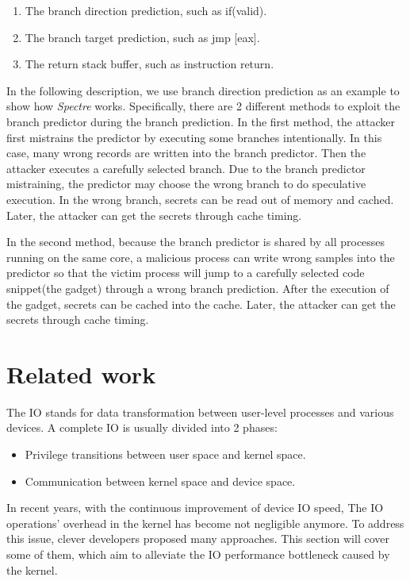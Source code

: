 \begin{enumerate}
  \item The branch direction prediction,  such as if(valid).
  \item The branch target prediction, such as jmp [eax].
  \item The return stack buffer, such as instruction return.
\end{enumerate}
In the following description, we use branch direction prediction as an example to show 
how \emph{Spectre} works.  Specifically, there are 2 different methods to exploit the branch 
predictor during the branch prediction.  In the first method, the attacker first mistrains 
the predictor by executing some branches intentionally.  In this case, many wrong records 
are written into the branch predictor. Then the attacker executes a carefully selected branch. 
Due to the branch predictor mistraining, the predictor may choose the wrong branch to do 
speculative execution.  In the wrong branch, secrets can be read out of memory and cached. 
Later, the attacker can get the secrets through cache timing\cite{11}.

In the second method, 
because the branch predictor is shared by all processes running on the same core, 
a malicious process can write wrong samples into the predictor so that the victim process will 
jump to a carefully selected code snippet(the gadget) through a wrong branch prediction. 
After the execution of the gadget, secrets can be cached into the cache. Later, the attacker 
can get the secrets through cache timing.

\section{Related work}
The IO stands for data transformation between user-level processes 
and various devices. A complete IO is usually divided into 2 phases:
\begin{itemize}
  \item Privilege transitions between user space and kernel space.
  \item Communication between kernel space and device space.
\end{itemize}  
In recent years, with the continuous improvement of device IO speed, 
The IO operations' overhead in the kernel has become not negligible anymore. 
To address this issue, clever developers proposed many approaches. 
This section will cover some of them, which aim to alleviate the IO 
performance bottleneck caused by the kernel.

